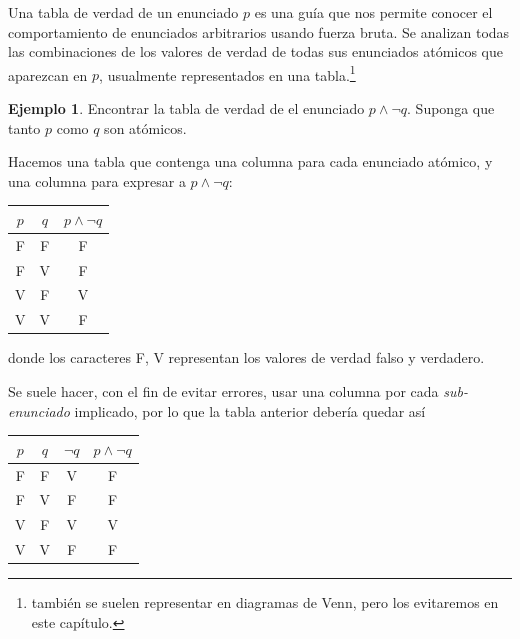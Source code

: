 \documentclass{book}
\theoremstyle{definition}
\newtheorem{ejm}{Ejemplo}[chapter]
\begin{document}
Una tabla de verdad de un enunciado $p$ es una guía que nos permite conocer el comportamiento de enunciados arbitrarios usando fuerza bruta.
Se analizan todas las combinaciones de los valores de verdad de todas sus enunciados atómicos que aparezcan en $p$, usualmente representados en una tabla.\footnote{también se suelen representar en diagramas de Venn, pero los evitaremos en este capítulo.}
\begin{ejm}
	Encontrar la tabla de verdad de el enunciado $p \wedge \neg q$. Suponga que tanto $p$ como $q$ son atómicos.
	
	Hacemos una tabla que contenga una columna para cada enunciado atómico, y una columna para expresar a $p \wedge \neg q$:

	\begin{center}\begin{tabular}{|c|c|c|}
		\hline
		$p$& $q$ & $p \wedge \neg q$ \\
		\hline \hline
		F & F & F \\
		\hline
		F & V & F \\
		\hline
		V & F & V \\
		\hline
		V & V & F \\
		\hline
	\end{tabular}\end{center}
	donde los caracteres F, V representan los valores de verdad falso y verdadero.
	
	Se suele hacer, con el fin de evitar errores, usar una columna por cada \emph{sub-enunciado} implicado, por lo que la tabla anterior debería quedar así
	\begin{center}\begin{tabular}{|c|c|c|c|}
		\hline
		$p$& $q$ & $\neg q$ &$p \wedge \neg q$ \\
		\hline \hline
		F & F & V & F \\
		\hline
		F & V & F & F \\
		\hline
		V & F & V & V \\
		\hline
		V & V & F & F \\
		\hline
\end{tabular}\end{center} 
\end{ejm}
\end{document}
